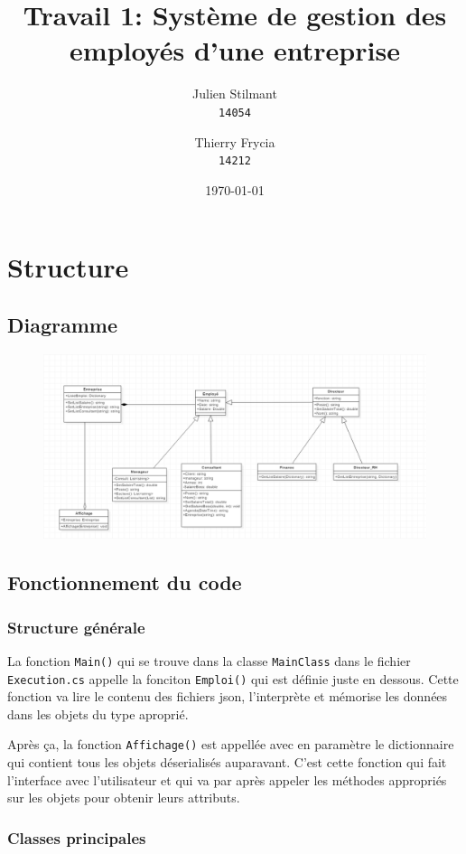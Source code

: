 \documentclass[a4paper, 11pt]{article}
\title{Travail 1: Système de gestion des employés d’une entreprise}
\author{Julien Stilmant\\\texttt{14054} \and Thierry Frycia\\\texttt{14212}}
\date{\today}
\begin{document}
\maketitle

\section{Structure}
\subsection{Diagramme}
\begin{figure}[htp]
\centering
\includegraphics[width=\textwidth]{uml.png}
\end{figure}

\subsection{Fonctionnement du code}
\subsubsection{Structure générale}
La fonction \texttt{Main()} qui se trouve dans la classe \texttt{MainClass} dans le fichier \texttt{Execution.cs} appelle la fonciton \texttt{Emploi()} qui est définie juste en dessous. Cette fonction va lire le contenu des fichiers json, l'interprète et mémorise les données dans les objets du type aproprié. 

Après ça, la fonction \texttt{Affichage()} est appellée avec en paramètre le dictionnaire qui contient tous les objets déserialisés auparavant. C'est cette fonction qui fait l'interface avec l'utilisateur et qui va par après appeler les méthodes appropriés sur les objets pour obtenir leurs attributs.

\subsubsection{Classes principales}
\end{document}
